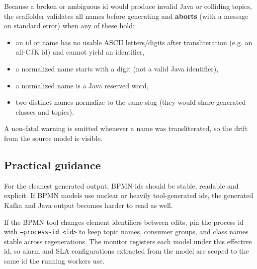 Because a broken or ambiguous id would produce invalid Java or colliding topics,
the scaffolder validates all names before generating and \textbf{aborts} (with a
message on standard error) when any of these hold:
\begin{itemize}
\item an id or name has no usable ASCII letters/digits after transliteration
(e.g. an all-CJK id) and cannot yield an identifier,
\item a normalized name starts with a digit (not a valid Java identifier),
\item a normalized name is a Java reserved word,
\item two distinct names normalize to the same slug (they would share generated
classes and topics).
\end{itemize}
A non-fatal warning is emitted whenever a name was transliterated, so the drift
from the source model is visible.

\subsection{Practical guidance}

For the cleanest generated output, BPMN ids should be stable, readable and
explicit. If BPMN models use unclear or heavily tool-generated ids, the
generated Kafka and Java output becomes harder to read as well.

If the BPMN tool changes element identifiers between edits, pin the process
id with \texttt{--process-id <id>} to keep topic names, consumer groups,
and class names stable across regenerations. The monitor registers each model
under this effective id, so alarm and SLA configurations extracted from the model
are scoped to the same id the running workers use.
